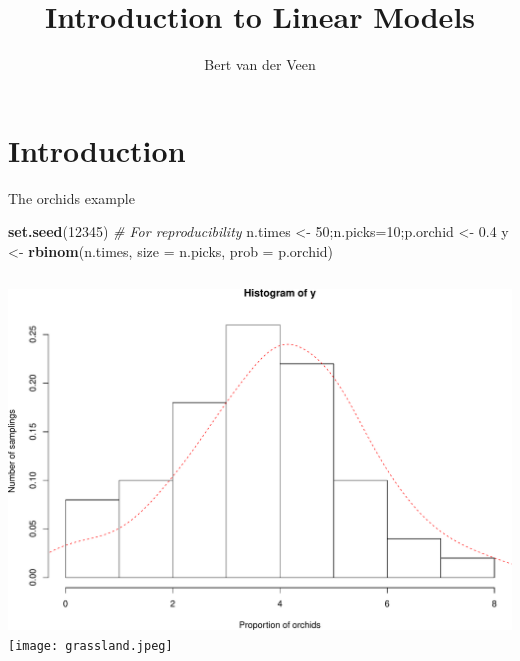 \documentclass[
  ignorenonframetext,
]{beamer}
\title{Introduction to Linear Models}
\author{Bert van der Veen}
\date{}
\institute{Department of Mathematical Sciences, NTNU}
\newenvironment{Shaded}{\begin{snugshade}}{\end{snugshade}}
\newcommand{\AttributeTok}[1]{\textcolor[rgb]{0.13,0.29,0.53}{#1}}
\newcommand{\CommentTok}[1]{\textcolor[rgb]{0.56,0.35,0.01}{\textit{#1}}}
\newcommand{\DecValTok}[1]{\textcolor[rgb]{0.00,0.00,0.81}{#1}}
\newcommand{\FloatTok}[1]{\textcolor[rgb]{0.00,0.00,0.81}{#1}}
\newcommand{\FunctionTok}[1]{\textcolor[rgb]{0.13,0.29,0.53}{\textbf{#1}}}
\newcommand{\NormalTok}[1]{#1}
\newcommand{\OtherTok}[1]{\textcolor[rgb]{0.56,0.35,0.01}{#1}}
\newcommand{\columnsbegin}{\begin{columns}}
\newcommand{\columnsend}{\end{columns}}
\begin{document}
\frame{\titlepage}

\hypertarget{introduction}{%
\section{Introduction}\label{introduction}}

\begin{frame}[fragile]{The orchids example}
\protect\hypertarget{the-orchids-example}{}
\begin{codebox}

\begin{Shaded}
\begin{Highlighting}[]
\FunctionTok{set.seed}\NormalTok{(}\DecValTok{12345}\NormalTok{) }\CommentTok{\# For reproducibility}
\NormalTok{n.times }\OtherTok{\textless{}{-}} \DecValTok{50}\NormalTok{;n.picks}\OtherTok{=}\DecValTok{10}\NormalTok{;p.orchid }\OtherTok{\textless{}{-}} \FloatTok{0.4}
\NormalTok{y }\OtherTok{\textless{}{-}} \FunctionTok{rbinom}\NormalTok{(n.times, }\AttributeTok{size =}\NormalTok{ n.picks, }\AttributeTok{prob =}\NormalTok{ p.orchid) }
\end{Highlighting}
\end{Shaded}

\end{codebox}

\columnsbegin
{}

\includegraphics{IntroLM_files/figure-beamer/unnamed-chunk-2-1.pdf}
 \texttt{[image: grassland.jpeg]} \columnsend
\end{frame}
\end{document}
